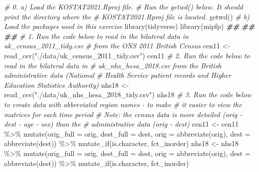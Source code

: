 \documentclass[
]{book}
\newenvironment{Shaded}{\begin{snugshade}}{\end{snugshade}}
\newcommand{\AttributeTok}[1]{\textcolor[rgb]{0.77,0.63,0.00}{#1}}
\newcommand{\CommentTok}[1]{\textcolor[rgb]{0.56,0.35,0.01}{\textit{#1}}}
\newcommand{\DocumentationTok}[1]{\textcolor[rgb]{0.56,0.35,0.01}{\textbf{\textit{#1}}}}
\newcommand{\FunctionTok}[1]{\textcolor[rgb]{0.00,0.00,0.00}{#1}}
\newcommand{\NormalTok}[1]{#1}
\newcommand{\OtherTok}[1]{\textcolor[rgb]{0.56,0.35,0.01}{#1}}
\newcommand{\SpecialCharTok}[1]{\textcolor[rgb]{0.00,0.00,0.00}{#1}}
\newcommand{\StringTok}[1]{\textcolor[rgb]{0.31,0.60,0.02}{#1}}
\begin{document}
\begin{Shaded}
\begin{Highlighting}[]
\CommentTok{\# 0.  a) Load the KOSTAT2021.Rproj file. }
\CommentTok{\#     Run the getwd() below. It should print the directory where the }
\CommentTok{\#     KOSTAT2021.Rproj file is located.}
\FunctionTok{getwd}\NormalTok{()}
\CommentTok{\#     b) Load the packages used in this exercise}
\FunctionTok{library}\NormalTok{(tidyverse)}
\FunctionTok{library}\NormalTok{(mipfp)}
\DocumentationTok{\#\#}
\DocumentationTok{\#\#}
\DocumentationTok{\#\#}
\CommentTok{\# 1. Run the code below to read in the bilateral data in uk\_census\_2011\_tidy.csv }
\CommentTok{\#    from the ONS 2011 British Census}
\NormalTok{cen11 }\OtherTok{\textless{}{-}} \FunctionTok{read\_csv}\NormalTok{(}\StringTok{"./data/uk\_census\_2011\_tidy.csv"}\NormalTok{)}
\NormalTok{cen11}
\CommentTok{\# 2. Run the code below to read in the bilateral data in }
\CommentTok{\#    uk\_nhs\_hesa\_2018.csv from the British administrative data (National}
\CommentTok{\#    Health Service patient records and Higher Education Statistics Authority)}
\NormalTok{nhs18 }\OtherTok{\textless{}{-}} \FunctionTok{read\_csv}\NormalTok{(}\StringTok{"./data/uk\_nhs\_hesa\_2018\_tidy.csv"}\NormalTok{)}
\NormalTok{nhs18}
\CommentTok{\# 3. Run the code below to create data with abbreviated region names {-} to make }
\CommentTok{\#    it easier to view the matrices for each time period}
\CommentTok{\#    Note: the census data is more detailed (orig {-} dest {-} age {-} sex) than the }
\CommentTok{\#          administrative data (orig {-} dest)}
\NormalTok{cen11 }\OtherTok{\textless{}{-}}\NormalTok{ cen11 }\SpecialCharTok{\%\textgreater{}\%}
  \FunctionTok{mutate}\NormalTok{(}\AttributeTok{orig\_full =}\NormalTok{ orig, }
         \AttributeTok{dest\_full =}\NormalTok{ dest, }
         \AttributeTok{orig =} \FunctionTok{abbreviate}\NormalTok{(orig),}
         \AttributeTok{dest =} \FunctionTok{abbreviate}\NormalTok{(dest)) }\SpecialCharTok{\%\textgreater{}\%}
  \FunctionTok{mutate\_if}\NormalTok{(is.character, fct\_inorder)}
\NormalTok{nhs18 }\OtherTok{\textless{}{-}}\NormalTok{ nhs18 }\SpecialCharTok{\%\textgreater{}\%}
  \FunctionTok{mutate}\NormalTok{(}\AttributeTok{orig\_full =}\NormalTok{ orig, }
         \AttributeTok{dest\_full =}\NormalTok{ dest, }
         \AttributeTok{orig =} \FunctionTok{abbreviate}\NormalTok{(orig),}
         \AttributeTok{dest =} \FunctionTok{abbreviate}\NormalTok{(dest)) }\SpecialCharTok{\%\textgreater{}\%}
  \FunctionTok{mutate\_if}\NormalTok{(is.character, fct\_inorder)}

\end{Highlighting}
\end{Shaded}
\end{document}
